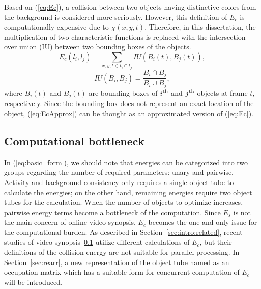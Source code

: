 \documentclass[11pt]{hyu_thesis}
\begin{document}
Based on (\ref{eq:Ec}), a collision between two objects having distinctive colors from the background is considered more seriously. However, this definition of $E_c$ is computationally expensive due to $\chi(x,y,t)$. Therefore, in this dissertation, the multiplication of two characteristic functions is replaced with the intersection over union (IU) between two bounding boxes of the objects.
\begin{equation}
\label{eq:EcApprox}
E_c(l_i,l_j)=\sum_{x,y,t \in t_i \cap t_j} IU \left( B_i(t),B_j(t) \right),
\end{equation}
\begin{equation}
IU(B_i,B_j)=\frac{B_i \cap B_j}{B_i \cup B_j},
\end{equation}
where $B_i(t)$ and $B_j(t)$ are bounding boxes of $i^{\rm{th}}$ and $j^{\rm{th}}$ objects at frame $t$, respectively. Since the bounding box does not represent an exact location of the object, (\ref{eq:EcApprox}) can be thought as an approximated version of (\ref{eq:Ec}).

\subsection{Computational bottleneck}
In (\ref{eq:basic_form}), we should note that energies can be categorized into two groups regarding the number of required parameters: unary and pairwise. Activity and background consistency only requires a single object tube to calculate the energies; on the other hand, remaining energies require two object tubes for the calculation. When the number of objects to optimize increases, pairwise energy terms become a bottleneck of the computation. Since $E_s$ is not the main concern of online video synopsis, $E_c$ becomes the one and only issue for the computational burden. As described in Section~\ref{sec:intro:related}, recent studies of video synopsis~\ref{} utilize different calculations of $E_c$, but their definitions of the collision energy are not suitable for parallel processing. In Section~\ref{sec:rearr}, a new representation of the object tube named as an occupation matrix which has a suitable form for concurrent computation of $E_c$ will be introduced.
\end{document}
